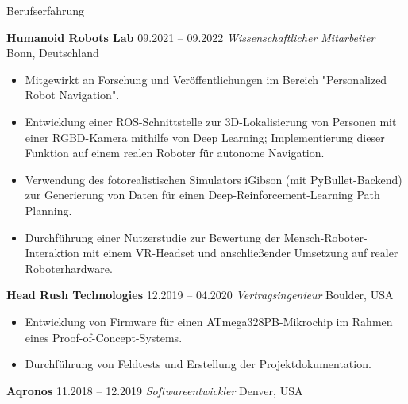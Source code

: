 \begin{rubric}{Berufserfahrung}

%
%
\entry*[] \textbf{Humanoid Robots Lab} \hfill 09.2021 -- 09.2022 \newline  
 \emph{Wissenschaftlicher Mitarbeiter} \hfill Bonn, Deutschland \newline  
\vspace{\CVItemizeHeaderSpacing} \begin{itemize}[leftmargin=*, rightmargin=1cm]
	\setlength{\itemsep}{\CVItemizeSpacing}  
	\item Mitgewirkt an Forschung und Veröffentlichungen im Bereich "Personalized Robot Navigation".  
	\item Entwicklung einer ROS-Schnittstelle zur 3D-Lokalisierung von Personen mit einer RGBD-Kamera mithilfe von Deep Learning; Implementierung dieser Funktion auf einem realen Roboter für autonome Navigation. 
	\item Verwendung des fotorealistischen Simulators iGibson (mit PyBullet-Backend) zur Generierung von Daten für einen Deep-Reinforcement-Learning Path Planning.  
	\item Durchführung einer Nutzerstudie zur Bewertung der Mensch-Roboter-Interaktion mit einem VR-Headset und anschließender Umsetzung auf realer Roboterhardware.  
\end{itemize}
%
%
\entry*[] \textbf{Head Rush Technologies} \hfill 12.2019 -- 04.2020 \newline  
 \emph{Vertragsingenieur} \hfill Boulder, USA \newline  
\vspace{\CVItemizeHeaderSpacing} \begin{itemize}[leftmargin=*, rightmargin=1cm]
	\setlength{\itemsep}{\CVItemizeSpacing}  
	\item Entwicklung von Firmware für einen ATmega328PB-Mikrochip im Rahmen eines Proof-of-Concept-Systems.
	\item Durchführung von Feldtests und Erstellung der Projektdokumentation.  
\end{itemize}
%
%
\entry*[] \textbf{Aqronos} \hfill 11.2018 -- 12.2019 \newline  
\emph{Softwareentwickler} \hfill Denver, USA \newline  

\end{rubric}
